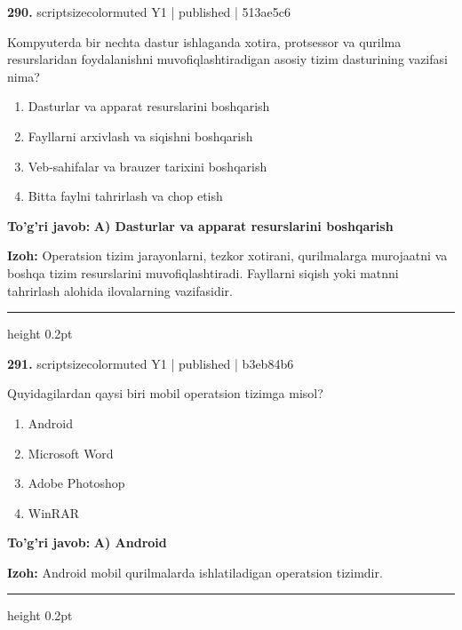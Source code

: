 \documentclass[10pt,a4paper]{article}
\begin{document}
{\bfseries\sffamily\color{ink} 290.} {scriptsizecolor{muted} Y1 | published | 513ae5c6}
\par
Kompyuterda bir nechta dastur ishlaganda xotira, protsessor va qurilma resurslaridan foydalanishni muvofiqlashtiradigan asosiy tizim dasturining vazifasi nima?
\begin{enumerate}[label=\Alph*),leftmargin=9mm]
\item Dasturlar va apparat resurslarini boshqarish
\item Fayllarni arxivlash va siqishni boshqarish
\item Veb-sahifalar va brauzer tarixini boshqarish
\item Bitta faylni tahrirlash va chop etish
\end{enumerate}
\begin{tcolorbox}[enhanced,breakable,colback=teal!4,colframe=teal!60!black,boxrule=0.45pt,arc=1.2mm,left=2.7mm,right=2.7mm,top=1.8mm,bottom=1.8mm,before skip=2mm,after skip=2mm]
{\bfseries\sffamily\color{teal}To'g'ri javob:} \textbf{A) Dasturlar va apparat resurslarini boshqarish}
\par\smallskip
{\bfseries Izoh:} Operatsion tizim jarayonlarni, tezkor xotirani, qurilmalarga murojaatni va boshqa tizim resurslarini muvofiqlashtiradi. Fayllarni siqish yoki matnni tahrirlash alohida ilovalarning vazifasidir.
\end{tcolorbox}
\vspace{2mm}\hrule height 0.2pt\vspace{3mm}

{\bfseries\sffamily\color{ink} 291.} {scriptsizecolor{muted} Y1 | published | b3eb84b6}
\par
Quyidagilardan qaysi biri mobil operatsion tizimga misol?
\begin{enumerate}[label=\Alph*),leftmargin=9mm]
\item Android
\item Microsoft Word
\item Adobe Photoshop
\item WinRAR
\end{enumerate}
\begin{tcolorbox}[enhanced,breakable,colback=teal!4,colframe=teal!60!black,boxrule=0.45pt,arc=1.2mm,left=2.7mm,right=2.7mm,top=1.8mm,bottom=1.8mm,before skip=2mm,after skip=2mm]
{\bfseries\sffamily\color{teal}To'g'ri javob:} \textbf{A) Android}
\par\smallskip
{\bfseries Izoh:} Android mobil qurilmalarda ishlatiladigan operatsion tizimdir.
\end{tcolorbox}
\vspace{2mm}\hrule height 0.2pt\vspace{3mm}
\end{document}
